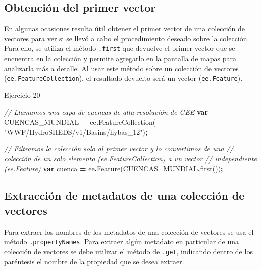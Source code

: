 \documentclass[
  12pt,
  letterpaper,
  twoside]{book}
\newenvironment{Shaded}{\begin{snugshade}}{\end{snugshade}}
\newcommand{\CommentTok}[1]{\textcolor[rgb]{0.56,0.35,0.01}{\textit{#1}}}
\newcommand{\FunctionTok}[1]{\textcolor[rgb]{0.00,0.00,0.00}{#1}}
\newcommand{\KeywordTok}[1]{\textcolor[rgb]{0.13,0.29,0.53}{\textbf{#1}}}
\newcommand{\NormalTok}[1]{#1}
\newcommand{\OperatorTok}[1]{\textcolor[rgb]{0.81,0.36,0.00}{\textbf{#1}}}
\newcommand{\StringTok}[1]{\textcolor[rgb]{0.31,0.60,0.02}{#1}}
\begin{document}
\hypertarget{obtenciuxf3n-del-primer-vector}{%
\subsection*{Obtención del primer vector}\label{obtenciuxf3n-del-primer-vector}}

En algunas ocasiones resulta útil obtener el primer vector de una colección de vectores para ver si se llevó a cabo el procedimiento deseado sobre la colección. Para ello, se utiliza el método \texttt{.first} que devuelve el primer vector que se encuentra en la colección y permite agregarlo en la pantalla de mapas para analizarla más a detalle. Al usar este método sobre un colección de vectores (\texttt{ee.FeatureCollection}), el resultado devuelto será un vector (\texttt{ee.Feature}).

Ejercicio 20

\begin{Shaded}
\begin{Highlighting}[]
\CommentTok{// Llamamos una capa de cuencas de alta resolución de GEE}
\KeywordTok{var}\NormalTok{ CUENCAS\_MUNDIAL }\OperatorTok{=}\NormalTok{ ee}\OperatorTok{.}\FunctionTok{FeatureCollection}\NormalTok{(}
  \StringTok{"WWF/HydroSHEDS/v1/Basins/hybas\_12"}\NormalTok{)}\OperatorTok{;}
 
\CommentTok{// Filtramos la colección solo al primer vector y lo convertimos de una}
\CommentTok{// colección de un solo elemento (ee.FeatureCollection) a un vector }
\CommentTok{// independiente (ee.Feature)}
\KeywordTok{var}\NormalTok{ cuenca }\OperatorTok{=}\NormalTok{ ee}\OperatorTok{.}\FunctionTok{Feature}\NormalTok{(CUENCAS\_MUNDIAL}\OperatorTok{.}\FunctionTok{first}\NormalTok{())}\OperatorTok{;} 
\end{Highlighting}
\end{Shaded}

\hypertarget{extracciuxf3n-de-metadatos-de-una-colecciuxf3n-de-vectores}{%
\subsection*{Extracción de metadatos de una colección de vectores}\label{extracciuxf3n-de-metadatos-de-una-colecciuxf3n-de-vectores}}

Para extraer los nombres de los metadatos de una colección de vectores se usa el método \texttt{.propertyNames}. Para extraer algún metadato en particular de una colección de vectores se debe utilizar el método de \texttt{.get}, indicando dentro de los paréntesis el nombre de la propiedad que se desea extraer.
\end{document}
